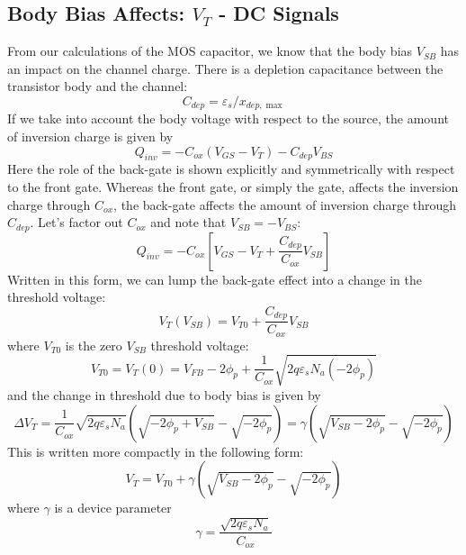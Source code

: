 \subsection{Body Bias Affects: \texorpdfstring{$V_T$}{Threshold Voltage} - DC Signals}
From our calculations of the MOS capacitor, we know that the body bias $V_{SB}$ has an impact on the channel charge.  There is a depletion capacitance between the transistor body and the channel:
    \begin{equation}
        {C_{dep}} = {\varepsilon _s}/{x_{dep,\max }}
    \end{equation}
If we take into account the body voltage with respect to the source, the amount of inversion charge is given by
    \begin{equation}
        {Q_{inv}} =  - {C_{ox}}({V_{GS}} - {V_T}) - {C_{dep}}{V_{BS}}
    \end{equation}
Here the role of the back-gate is shown explicitly and symmetrically with respect to the front gate.  Whereas the front gate, or simply the gate, affects the inversion charge through $C_{ox}$, the back-gate affects the amount of inversion charge through $C_{dep}$.  
Let's factor out $C_{ox}$ and note that $V_{SB} = - V_{BS}$:
    \begin{equation}
        {Q_{inv}} =  - {C_{ox}}\left[ {{V_{GS}} - {V_T} + \frac{{{C_{dep}}}}{{{C_{ox}}}}{V_{SB}}} \right]
    \end{equation}
Written in this form, we can lump the back-gate effect into a change in the threshold voltage:
    \begin{equation}
        {V_T}({V_{SB}}) = {V_{T0}} + \frac{{{C_{dep}}}}{{{C_{ox}}}}{V_{SB}}
    \end{equation}
where $V_{T0}$ is the zero $V_{SB}$ threshold voltage:
    \begin{equation}
        {V_{T0}} = {V_T}(0) = {V_{FB}} - 2{\phi _p} + \frac{1}{{{C_{ox}}}}\sqrt {2q{\varepsilon _s}{N_a}( - 2{\phi _p})} 
    \end{equation}
and the change in threshold due to body bias is given by
    \begin{equation}
        \Delta {V_T} = \frac{1}{{{C_{ox}}}}\sqrt {2q{\varepsilon _s}{N_a}} \left(\sqrt { - 2{\phi _p} + {V_{SB}}}  - \sqrt { - 2{\phi _p}} \right) = \gamma \left( {\sqrt {{V_{SB}} - 2{\phi _p}}  - \sqrt { - 2{\phi _p}}}\right)
    \end{equation}
This is written more compactly in the following form:
    \begin{equation}
        {V_T} = {V_{T0}} + \gamma \left( {\sqrt {{V_{SB}} - 2{\phi _p}} - \sqrt {-2{\phi _p}}} \right)
        \label{eq:vtbias}
    \end{equation}
where $\gamma$ is a device parameter
    \begin{equation}
        \gamma = \frac{\sqrt{2q\varepsilon_s N_a}}{C_{ox}}
    \end{equation}

